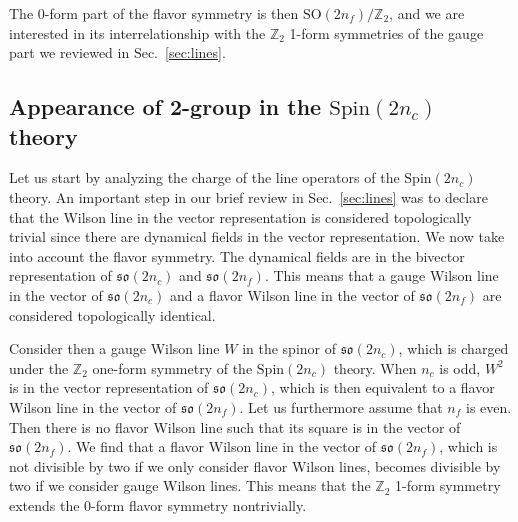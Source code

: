 \documentclass[12pt]{article}
\numberwithin{equation}{section}
\newcommand*{\bZ}{\mathbb{Z}}
\def\SO{\mathrm{SO}}
\def\so{\mathfrak{so}}
\def\Spin{\mathrm{Spin}}
\begin{document}
The 0-form part of the flavor symmetry is then $\SO(2n_f)/\bZ_2$,
and we are interested in its interrelationship with the $\bZ_2$ 1-form symmetries of the gauge part we reviewed in Sec.~\ref{sec:lines}.

\subsection{Appearance of 2-group in the $\Spin(2n_c)$ theory}
Let us start by analyzing the charge of the line operators of the $\Spin(2n_c)$ theory.
An important step in our brief review in Sec.~\ref{sec:lines}
was to declare that the Wilson line in the vector representation is considered topologically trivial
since there are dynamical fields in the vector representation.
We now take into account the flavor symmetry.
The dynamical fields are in the bivector representation of $\so(2n_c)$ and $\so(2n_f)$.
This means that a gauge Wilson line in the vector of $\so(2n_c)$
and a flavor Wilson line in the vector of $\so(2n_f)$ are considered topologically identical.

Consider then a gauge Wilson line $W$ in the spinor of $\so(2n_c)$,
which is charged under the $\bZ_2$ one-form symmetry of the $\Spin(2n_c)$ theory.
When $n_c$ is odd, $W^2$ is in the vector representation of $\so(2n_c)$,
which is then equivalent to a flavor Wilson line in the vector of $\so(2n_f)$.
Let us furthermore assume that $n_f$ is even.
Then there is no flavor Wilson line such that its square is in the vector of $\so(2n_f)$.
We find that a flavor Wilson line in the vector of $\so(2n_f)$,
which is not divisible by two if we only consider flavor Wilson lines,
becomes divisible by two if we consider gauge Wilson lines.
This means that the $\bZ_2$ 1-form symmetry extends the 0-form flavor symmetry nontrivially.
\end{document}

